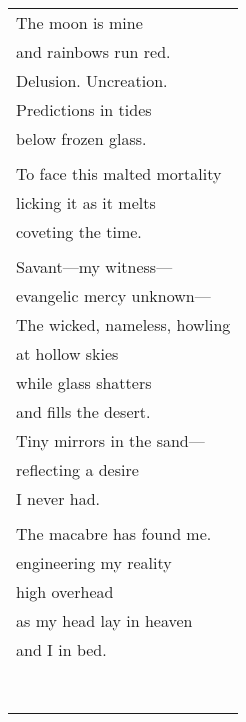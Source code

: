 \documentclass{article}
\begin{document}
\begin{center}
\begin{tabular}{l}
\end{tabular}
\begin{tabular}{l}
The moon is mine \\
and rainbows run red. \\
Delusion. Uncreation. \\
Predictions in tides \\
below frozen glass. \\
\\
To face this malted mortality \\
licking it as it melts \\
coveting the time. \\
\\
Savant---my witness--- \\
evangelic mercy unknown--- \\
The wicked, nameless, howling \\
at hollow skies \\
while glass shatters \\
and fills the desert. \\
Tiny mirrors in the sand--- \\
reflecting a desire \\
I never had. \\
\\
The macabre has found me. \\
engineering my reality \\
high overhead \\
as my head lay in heaven \\
and I in bed. \\
\\
\\
\\
\\
\\
\\
\\
\\
\end{tabular}
\end{center}
\end{document}

